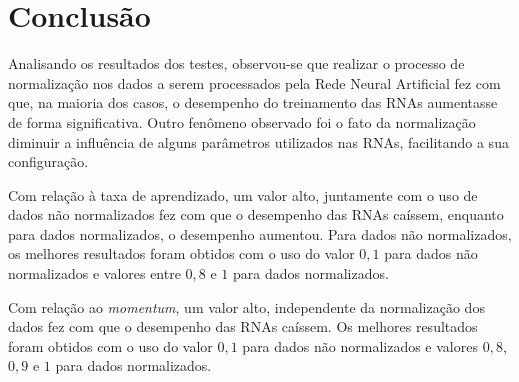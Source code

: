 \documentclass[12pt,oneside,a4paper,chapter=TITLE,section=TITLE,sumario
		=tradicional]{abntex2}
\begin{document}
\begin{comment}
		Observando os gráficos acima, percebemos que a normalização ocasionou uma melhora no desempenho de aproximadamente 20\%. Além disso, observou-se que para as RNAs com a base normalizada, os parâmetros \textit{batch size}, número de ciclos, \textit{momentum} e número de neurônios tiveram uma maior influência. A substituição da função de ativação tangente hiperbólica pela logística ocasionou uma piora de aproximadamente 7,6\%, indicando que o uso da primeira permite um desempenho melhor.
		
		Analisando as RNAs com a base normalizada, percebe-se que a maioria dos parâmetros teve uma influência menor. Os parâmetros que tiveram uma influência positiva no desempenho foram o número de neurônios, taxa de aprendizado, número de ciclos e o número de camadas ocultas, que influenciou de forma insignificante e somente nas RNAs normalizadas com a função da tangente hiperbólica.
		\end{comment}
		
		\chapter{Conclusão}
		\label{cap:conclusao}
			
		Analisando os resultados dos testes, observou-se que realizar o processo de normalização nos dados a serem processados pela Rede Neural Artificial fez com que, na maioria dos casos, o desempenho do treinamento das RNAs aumentasse de forma significativa. Outro fenômeno observado foi o fato da normalização diminuir a influência de alguns parâmetros utilizados nas RNAs, facilitando a sua configuração. 
		
		Com relação à taxa de aprendizado, um valor alto, juntamente com o uso de dados não normalizados fez com que o desempenho das RNAs caíssem, enquanto para dados normalizados, o desempenho aumentou. Para dados não normalizados, os melhores resultados foram obtidos com o uso do valor $0,1$ para dados não normalizados e valores entre $0,8$ e $1$ para dados normalizados.
		
		Com relação ao \textit{momentum}, um valor alto, independente da normalização dos dados fez com que o desempenho das RNAs caíssem. Os melhores resultados foram obtidos com o uso do valor $0,1$ para dados não normalizados e valores $0,8$, $0,9$ e $1$ para dados normalizados.
		
\end{document}
